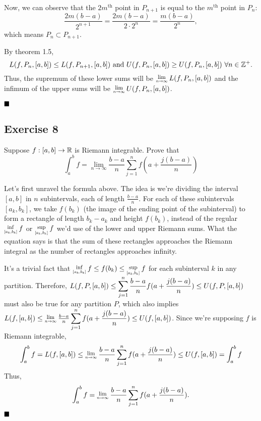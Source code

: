 Now, we can observe that the $2m^\textrm{th}$ point in $P_{n+1}$ is equal to the $m^\textrm{th}$ point in $P_n$: \[\frac{2m(b-a)}{2^{n+1}} = \frac{2m(b-a)}{2\cdot2^n} = \frac{m(b-a)}{2^n},\] which means $P_n \subset P_{n+1}$.

By theorem 1.5, \[L(f,P_n,[a,b]) \leq L(f,P_{n+1},[a,b]) \textrm{ and } U(f,P_n,[a,b]) \geq U(f,P_n,[a,b])\ \forall n\in\integers^+.\] Thus, the supremum of these lower sums will be $\Lim{n\rightarrow\infty}L(f,P_n,[a,b])$ and the infimum of the upper sums will be $\Lim{n\rightarrow\infty}U(f,P_n,[a,b])$.

$\qed$

\subsection{Exercise 8}

\begin{formulationBox}
	Suppose $f:[a,b]\rightarrow\mathbb{R}$ is Riemann integrable. Prove that \[\int_a^bf=\lim_{n\rightarrow\infty}\frac{b-a}{n}\sum_{j=1}^{n}f(a+\frac{j(b-a)}{n})\]
\end{formulationBox}

Let's first unravel the formula above. The idea is we're dividing the interval $[a,b]$ in $n$ subintervals, each of length $\frac{b-a}{n}$. For each of these subintervals $[a_k, b_k]$, we take $f(b_k)$ (the image of the ending point of the subinterval) to form a rectangle of length $b_k-a_k$ and height $f(b_k)$, instead of the regular $\Inf{[a_k, b_k]}f$ or $\Sup{[a_k, b_k]}f$ we'd use of the lower and upper Riemann sums. What the equation says is that the sum of these rectangles approaches the Riemann integral as the number of rectangles approaches infinity.

It's a trivial fact that $\Inf{[a_k, b_k]}f \leq f(b_k) \leq \Sup{[a_k, b_k]}f$ for each subinterval $k$ in any partition. Therefore, $L(f, P, [a,b]) \leq \displaystyle \sum_{j=1}^{n}\frac{b-a}{n}f(a + \frac{j(b-a)}{n}) \leq U(f, P, [a,b])$ must also be true for any partition $P$, which also implies $L(f, [a,b]) \leq \Lim{n\rightarrow\infty}\frac{b-a}{n}\Sum{j=1}{n}f(a + \frac{j(b-a)}{n}) \leq U(f, [a,b])$. Since we're supposing $f$ is Riemann integrable, \[\Int{a}{b}f = L(f, [a,b]) \leq \Lim{n\rightarrow\infty}\frac{b-a}{n}\Sum{j=1}{n}f(a + \frac{j(b-a)}{n}) \leq U(f, [a,b]) = \Int{a}{b}f\]
Thus,
\[\int_a^bf = \Lim{n\rightarrow\infty}\frac{b-a}{n}\Sum{j=1}{n}f(a + \frac{j(b-a)}{n}).\]
$\qed$
